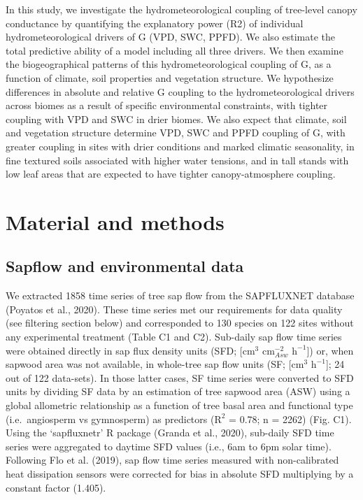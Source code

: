 \documentclass[11pt,twoside]{reedthesis}
\begin{document}
In this study, we investigate the hydrometeorological coupling of
tree-level canopy conductance by quantifying the explanatory power (R2)
of individual hydrometeorological drivers of G (VPD, SWC, PPFD). We also
estimate the total predictive ability of a model including all three
drivers. We then examine the biogeographical patterns of this
hydrometeorological coupling of G, as a function of climate, soil
properties and vegetation structure. We hypothesize differences in
absolute and relative G coupling to the hydrometeorological drivers
across biomes as a result of specific environmental constraints, with
tighter coupling with VPD and SWC in drier biomes. We also expect that
climate, soil and vegetation structure determine VPD, SWC and PPFD
coupling of G, with greater coupling in sites with drier conditions and
marked climatic seasonality, in fine textured soils associated with
higher water tensions, and in tall stands with low leaf areas that are
expected to have tighter canopy-atmosphere coupling.\par

\section{Material and methods}\label{material-and-methods}

\subsection{Sapflow and environmental
data}\label{sapflow-and-environmental-data}

We extracted 1858 time series of tree sap flow from the SAPFLUXNET
database (Poyatos et al., 2020). These time series met our requirements
for data quality (see filtering section below) and corresponded to 130
species on 122 sites without any experimental treatment (Table C1 and
C2). Sub-daily sap flow time series were obtained directly in sap flux
density units (SFD; {[}\(\text{cm}^3\) \(\text{cm}^{-2}_{Asw}\)
\(\text{h}^{-1}\){]}) or, when sapwood area was not available, in
whole-tree sap flow units (SF; {[}\(\text{cm}^3\) \(\text{h}^{-1}\){]};
24 out of 122 data-sets). In those latter cases, SF time series were
converted to SFD units by dividing SF data by an estimation of tree
sapwood area (ASW) using a global allometric relationship as a function
of tree basal area and functional type (i.e.~angiosperm vs gymnosperm)
as predictors (\(\text{R}^2\) = 0.78; n = 2262) (Fig. C1). Using the
`sapfluxnetr' R package (Granda et al., 2020), sub-daily SFD time series
were aggregated to daytime SFD values (i.e., 6am to 6pm solar time).
Following Flo et al. (2019), sap flow time series measured with
non-calibrated heat dissipation sensors were corrected for bias in
absolute SFD multiplying by a constant factor (1.405).\par
\end{document}
